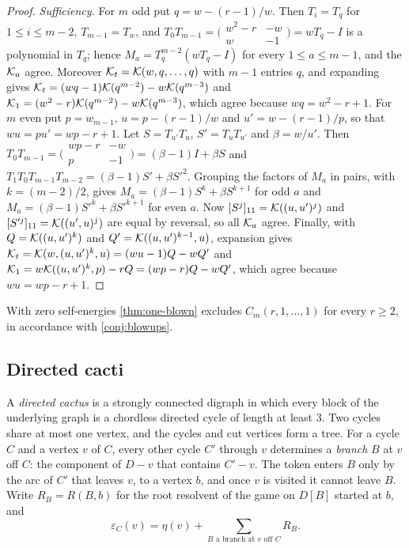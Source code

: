 \begin{proof}
\emph{Sufficiency.} For $m$ odd put $q=w-(r-1)/w$. Then $T_i=T_q$ for $1\le i\le m-2$, $T_{m-1}=T_w$, and $T_0T_{m-1}=\bigl(\begin{smallmatrix}w^2-r&-w\\w&-1\end{smallmatrix}\bigr)=wT_q-I$ is a polynomial in $T_q$; hence $M_a=T_q^{m-2}(wT_q-I)$ for every $1\le a\le m-1$, and the $\mathcal{K}_a$ agree. Moreover $\mathcal{K}_t=\mathcal{K}(w,q,\dots,q)$ with $m-1$ entries $q$, and expanding gives $\mathcal{K}_t=(wq-1)\mathcal{K}(q^{m-2})-w\mathcal{K}(q^{m-3})$ and $\mathcal{K}_1=(w^2-r)\mathcal{K}(q^{m-2})-w\mathcal{K}(q^{m-3})$, which agree because $wq=w^2-r+1$. For $m$ even put $p=w_{m-1}$, $u=p-(r-1)/w$ and $u'=w-(r-1)/p$, so that $wu=pu'=wp-r+1$. Let $S=T_{u'}T_u$, $S'=T_uT_{u'}$ and $\beta=w/u'$. Then $T_0T_{m-1}=\bigl(\begin{smallmatrix}wp-r&-w\\p&-1\end{smallmatrix}\bigr)=(\beta-1)I+\beta S$ and $T_1T_0T_{m-1}T_{m-2}=(\beta-1)S'+\beta S'^2$. Grouping the factors of $M_a$ in pairs, with $k=(m-2)/2$, gives $M_a=(\beta-1)S^{k}+\beta S^{k+1}$ for odd $a$ and $M_a=(\beta-1)S'^{k}+\beta S'^{k+1}$ for even $a$. Now $[S^{j}]_{11}=\mathcal{K}((u,u')^{j})$ and $[S'^{j}]_{11}=\mathcal{K}((u',u)^{j})$ are equal by reversal, so all $\mathcal{K}_a$ agree. Finally, with $Q=\mathcal{K}((u,u')^{k})$ and $Q'=\mathcal{K}((u,u')^{k-1},u)$, expansion gives $\mathcal{K}_t=\mathcal{K}(w,(u,u')^{k},u)=(wu-1)Q-wQ'$ and $\mathcal{K}_1=w\mathcal{K}((u,u')^{k},p)-rQ=(wp-r)Q-wQ'$, which agree because $wu=wp-r+1$.
\end{proof}

With zero self-energies \cref{thm:one-blown} excludes $C_m(r,1,\dots,1)$ for every $r\ge2$, in accordance with \cref{conj:blowups}.

\subsection{Directed cacti}
A \emph{directed cactus} is a strongly connected digraph in which every block of the underlying graph is a chordless directed cycle of length at least $3$. Two cycles share at most one vertex, and the cycles and cut vertices form a tree. For a cycle $C$ and a vertex $v$ of $C$, every other cycle $C'$ through $v$ determines a \emph{branch} $B$ at $v$ off $C$: the component of $D-v$ that contains $C'-v$. The token enters $B$ only by the arc of $C'$ that leaves $v$, to a vertex $b$, and once $v$ is visited it cannot leave $B$. Write $R_B=R(B,b)$ for the root resolvent of the game on $D[B]$ started at $b$, and
\[
\varepsilon_C(v)=\eta(v)+\sum_{B\text{ a branch at }v\text{ off }C}R_B.
\]

